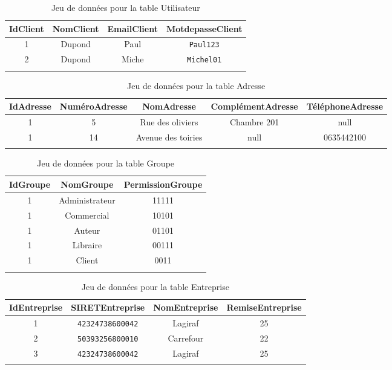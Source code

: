 \documentclass[a4paper, 13pt]{article}
\begin{document}
\begin{center}
    \begin{longtable}{|c|c|c|c|}
        \hline
        \textbf{IdClient} & \textbf{NomClient} & \textbf{EmailClient} & \textbf{MotdepasseClient} \\
        \hline
        \hline
        1 & Dupond & Paul & \texttt{Paul123} \\
        2 & Dupond & Miche & \texttt{Michel01} \\
        \hline
        \caption{Jeu de données pour la table Utilisateur}
    \end{longtable}
\end{center}
\begin{center}
    \begin{longtable}{|c|c|c|c|c|}
        \hline
        \textbf{IdAdresse} & \textbf{NuméroAdresse} & \textbf{NomAdresse} & \textbf{ComplémentAdresse} & \textbf{TéléphoneAdresse} \\
        \hline
        \hline
        1 & 5 & Rue des oliviers & Chambre 201 & null \\
        1 & 14 & Avenue des toiries & null & 0635442100 \\
        \hline
        \caption{Jeu de données pour la table Adresse}
    \end{longtable}
\end{center}
\begin{center}
    \begin{longtable}{|c|c|c|}
        \hline
        \textbf{IdGroupe} & \textbf{NomGroupe} & \textbf{PermissionGroupe} \\
        \hline
        \hline
        1 & Administrateur & 11111 \\
        1 & Commercial & 10101 \\
        1 & Auteur & 01101 \\
        1 & Libraire & 00111 \\
        1 & Client & 0011 \\
        \hline
        \caption{Jeu de données pour la table Groupe}
    \end{longtable}
\end{center}

\begin{center}
    \begin{longtable}{|c|c|c|c|}
        \hline
        \textbf{IdEntreprise} & \textbf{SIRETEntreprise} & \textbf{NomEntreprise} & \textbf{RemiseEntreprise} \\
        \hline
        \hline
        1 & \texttt{42324738600042} & Lagiraf & 25 \\
        2 & \texttt{50393256800010} & Carrefour & 22 \\
        3 & \texttt{42324738600042} & Lagiraf & 25 \\
        \hline
        \caption{Jeu de données pour la table Entreprise}
    \end{longtable}
\end{center}
\end{document}
